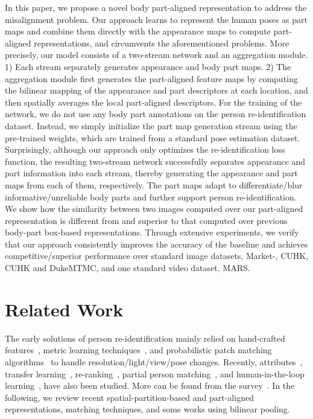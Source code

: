 \documentclass{llncs}
\begin{document}
In this paper, we propose a novel body part-aligned representation to address the misalignment problem. Our approach learns to represent the human poses as part maps and combine them directly with the appearance maps to compute part-aligned representations, and circumvents the aforementioned problems. More precisely, our model consists of a two-stream network and an aggregation module. 1) Each stream separately generates appearance and body part maps. 2) The aggregation module first generates the part-aligned feature maps by computing the bilinear mapping of the appearance and part descriptors at each location, and then spatially averages the local part-aligned descriptors. For the training of the network, we do not use any body part annotations on the person re-identification dataset. Instead, we simply initialize the part map generation stream using the pre-trained weights, which are trained from a standard pose estimation dataset. Surprisingly, although our approach only optimizes the re-identification loss function, the resulting two-stream network successfully separates appearance and part information into each stream, thereby generating the appearance and part maps from each of them, respectively. {\color{black}The part maps adapt to differentiate/blur informative/unreliable body parts} and further support person re-identification. We show how the similarity between two images computed over our part-aligned representation is different from and superior to that computed over previous body-part box-based representations. Through extensive experiments, we verify that our approach consistently improves the accuracy of the baseline and achieves competitive/superior performance over standard image datasets, Market-, CUHK,  CUHK and DukeMTMC, and one standard video dataset, MARS.

\section{Related Work}
The early solutions of person re-identification mainly relied on hand-crafted features~\cite{ma2012local,LOMO2015,viewpoint2008,MatsukawaOSS16}, metric learning techniques~\cite{null2016,ZhangLLIR16,PaisitkriangkraiSV15,psd2015,KodirovXFG16,LiZWXG15,JingZWYKYHX15}, and probabilistic patch matching algorithms~\cite{dapeng2015,ChenYCZ16,correspondence2015} to handle resolution/light/view/pose changes. Recently, attributes~\cite{SuYZTDLG15,SuZX0T16,ZhaoOW14}, transfer learning~\cite{PengXWPGHT16,ShiHX15}, re-ranking~\cite{ZhengWTHLT15,GarciaMMG15},
partial person matching~\cite{ZhengLXLLG15}, and human-in-the-loop learning~\cite{MartinelDMR16,WangGZX16},
have also been studied. More can be found from the survey~\cite{ZhengYH16}.
In the following,
we review recent spatial-partition-based and part-aligned representations, matching techniques, 
and some works using bilinear pooling.
\end{document}
